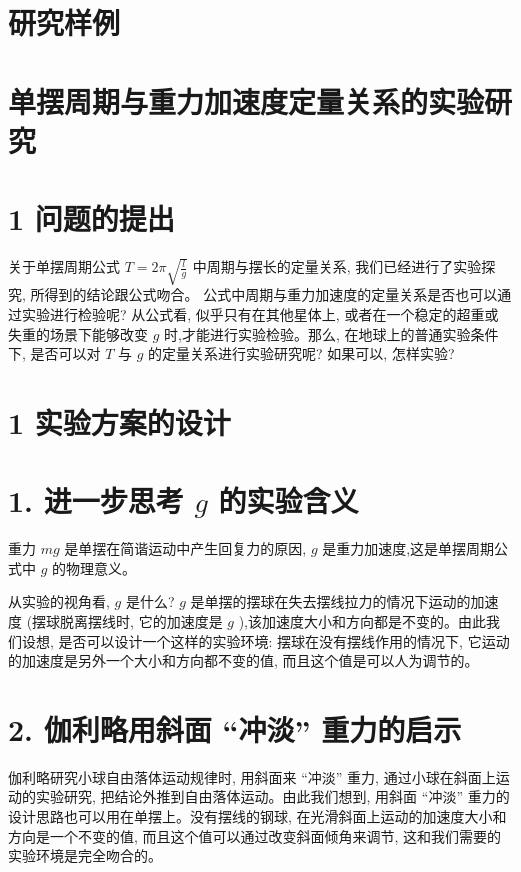 \documentclass[10pt]{article}
\begin{document}
\section*{研究样例}

\section*{单摆周期与重力加速度定量关系的实验研究}

\section*{1 问题的提出}

关于单摆周期公式 \(T = {2\pi }\sqrt{\frac{l}{g}}\) 中周期与摆长的定量关系, 我们已经进行了实验探究, 所得到的结论跟公式吻合。 公式中周期与重力加速度的定量关系是否也可以通过实验进行检验呢? 从公式看, 似乎只有在其他星体上, 或者在一个稳定的超重或失重的场景下能够改变 \(g\) 时,才能进行实验检验。那么, 在地球上的普通实验条件下, 是否可以对 \(T\) 与 \(g\) 的定量关系进行实验研究呢? 如果可以, 怎样实验?

\section*{1 实验方案的设计}

\section*{1. 进一步思考 \(g\) 的实验含义}

重力 \({mg}\) 是单摆在简谐运动中产生回复力的原因, \(g\) 是重力加速度,这是单摆周期公式中 \(g\) 的物理意义。

从实验的视角看, \(g\) 是什么? \(g\) 是单摆的摆球在失去摆线拉力的情况下运动的加速度 (摆球脱离摆线时, 它的加速度是 \(g\) ),该加速度大小和方向都是不变的。由此我们设想, 是否可以设计一个这样的实验环境: 摆球在没有摆线作用的情况下, 它运动的加速度是另外一个大小和方向都不变的值, 而且这个值是可以人为调节的。

\section*{2. 伽利略用斜面 “冲淡” 重力的启示}

伽利略研究小球自由落体运动规律时, 用斜面来 “冲淡” 重力, 通过小球在斜面上运动的实验研究, 把结论外推到自由落体运动。由此我们想到, 用斜面 “冲淡” 重力的设计思路也可以用在单摆上。没有摆线的钢球, 在光滑斜面上运动的加速度大小和方向是一个不变的值, 而且这个值可以通过改变斜面倾角来调节, 这和我们需要的实验环境是完全吻合的。
\end{document}
